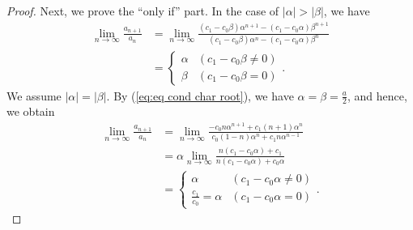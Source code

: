 \documentclass[a4paper,11pt,reqno]{amsart}
\theoremstyle{plain}
\theoremstyle{definition}
\begin{document}
\begin{proof}
Next, we prove the ``only if'' part. 
In the case of $|\alpha |>|\beta |$, we have 
\begin{align*}
\lim_{n \to \infty}
   \frac{a_{n+1}}{a_{n}}
   &=
   \lim_{n \to \infty}
   \frac{(c_{1}-c_{0}\beta )\alpha ^{n+1}-(c_{1}-c_{0}\alpha )\beta ^{n+1}}{(c_{1}-c_{0}\beta )\alpha ^{n}-(c_{1}-c_{0}\alpha )\beta ^{n}} \\
   &=
   \begin{cases}
   \alpha & (c_{1}-c_{0}\beta \not=0) \\
   \beta & (c_{1}-c_{0}\beta =0)
   \end{cases}.
\end{align*}
We assume $|\alpha |=|\beta |$. 
By (\ref{eq:eq cond char root}), we have $\alpha =\beta =\frac{a}{2}$, and hence, we obtain 
\begin{align*}
\lim_{n \to \infty}
   \frac{a_{n+1}}{a_{n}}
   &=
   \lim_{n \to \infty}
   \frac{-c_{0}n\alpha ^{n+1}+c_{1}(n+1)\alpha ^{n}}{c_{0}(1-n)\alpha ^{n}+c_{1}n\alpha ^{n-1}} \\
   &=
   \alpha 
   \lim_{n \to \infty}
   \frac{n(c_{1}-c_{0}\alpha )+c_{1}}{n(c_{1}-c_{0}\alpha )+c_{0}\alpha} \\
   &=
   \begin{cases}
   \alpha & (c_{1}-c_{0}\alpha \not=0) \\
   \frac{c_{1}}{c_{0}}=\alpha & (c_{1}-c_{0}\alpha =0)
   \end{cases}.
\end{align*}
\end{proof}
\end{document}
